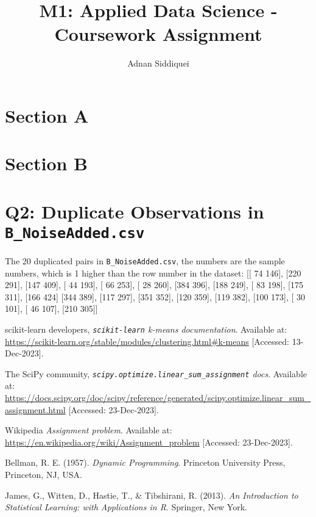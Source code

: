 \documentclass[a4paper,11pt]{article}
\title{\boldmath M1: Applied Data Science - Coursework Assignment}
\author{Adnan Siddiquei}
\affiliation{University of Cambridge}
\newcommand{\inlinecode}[1]{\lstinline{#1}}
\begin{document}
\maketitle
\flushbottom


\section{Section A}\label{sec:section-a}





\section{Section B}\label{sec:section-b}



\clearpage

\appendix

\section{Q2: Duplicate Observations in \inlinecode{B_NoiseAdded.csv}}\label{appendix:q2}
The 20 duplicated pairs in \inlinecode{B_NoiseAdded.csv}, the numbers are the sample numbers, which is 1 higher than the
row number in the dataset:
[[ 74 146], [220 291], [147 409], [ 44 193], [ 66 253], [ 28 260], [384 396], [188 249], [ 83 198], [175 311], [166 424]
 [344 389], [117 297], [351 352], [120 359], [119 382], [100 173], [ 30 101], [ 46 107], [210 305]]


\begin{thebibliography}{99}

scikit-learn developers,
\textit{\inlinecode{scikit-learn} k-means documentation}.
Available at: \url{https://scikit-learn.org/stable/modules/clustering.html#k-means}
[Accessed: 13-Dec-2023].

The SciPy community,
\textit{\inlinecode{scipy.optimize.linear_sum_assignment} docs}.
Available at: \url{https://docs.scipy.org/doc/scipy/reference/generated/scipy.optimize.linear_sum_assignment.html}
[Accessed: 23-Dec-2023].

Wikipedia
\textit{Assignment problem}.
Available at: \url{https://en.wikipedia.org/wiki/Assignment_problem}
[Accessed: 23-Dec-2023].

Bellman, R. E. (1957).
\textit{Dynamic Programming}.
Princeton University Press, Princeton, NJ, USA.

James, G., Witten, D., Hastie, T., \& Tibshirani, R. (2013).
\textit{An Introduction to Statistical Learning: with Applications in R}.
Springer, New York.


\end{thebibliography}
\end{document}

